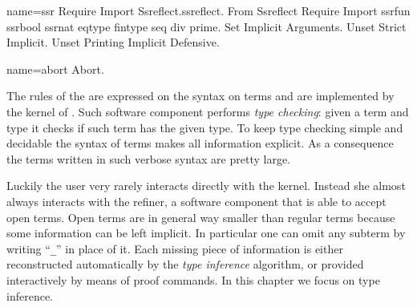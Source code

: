 \begin{coqdef}{name=ssr}
Require Import Ssreflect.ssreflect.
From Ssreflect Require Import ssrfun ssrbool ssrnat eqtype fintype seq div prime.
Set Implicit Arguments.
Unset Strict Implicit.
Unset Printing Implicit Defensive.
\end{coqdef}
\begin{coqdef}{name=abort}
Abort.
\end{coqdef}


The rules of the \mcbCIC{} are expressed on the syntax on terms and
are implemented by the kernel of \Coq{}.  Such software component
performs \emph{type checking}: given a term and type it checks if such
term has the given type.  To keep type checking simple and decidable
the syntax of terms makes all information explicit. As a consequence
the terms written in such verbose syntax are pretty large.

Luckily the user very rarely interacts directly with the kernel.
Instead she almost always interacts with the refiner, a software
component that is able to accept open terms.  Open terms are in
general way smaller than regular terms because some information can be
left implicit.  In particular one can omit any subterm by writing
``\lstinline/_/'' in place of it.
Each missing piece of information is either reconstructed
automatically by the \emph{type inference} algorithm, or provided
interactively by means of proof commands.  In this chapter we
focus on type inference.

